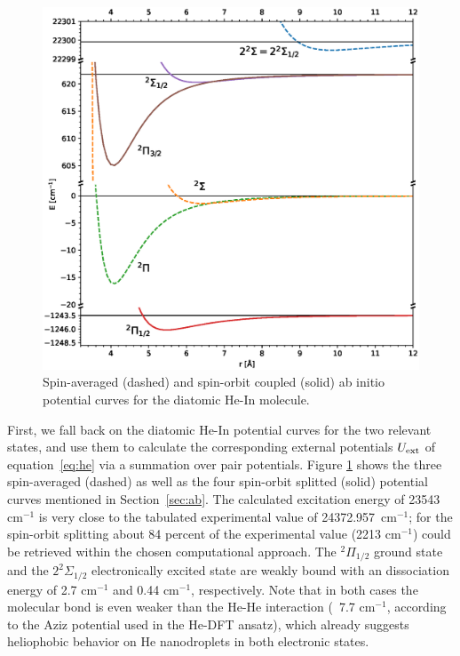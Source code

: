\documentclass[twoside,twocolumn,9pt]{article}
\begin{document}
\begin{figure}[h!]
  	\begin{center}
 		\includegraphics[width=\columnwidth]{2.eps}
                \caption{Spin-averaged (dashed) and spin-orbit coupled (solid) ab initio potential curves for the diatomic He-In molecule. \label{pic:pes}}
  	\end{center}
\end{figure}

First, we fall back on the diatomic He-In potential curves for the two relevant states, and use them to calculate the corresponding external potentials $U_{\rm ext}$ of equation~\ref{eq:he} via a summation over pair potentials. Figure \ref{pic:pes} shows the three spin-averaged (dashed) as well as the four spin-orbit splitted  (solid) potential curves mentioned in Section~\ref{sec:ab}. The calculated excitation energy of 23543 cm$^{-1}$ is very close to the tabulated experimental value of 24372.957~cm$^{-1}$; for the spin-orbit splitting about 84 percent of the experimental value (2213 cm$^{-1}$)  could be retrieved within the chosen computational approach.\cite{NIST} The $^2\Pi_{1/2}$ ground state and the $2^2\Sigma{}_{1/2}$ electronically excited state are weakly bound with an dissociation energy of 2.7 cm$^{-1}$ and 0.44 cm$^{-1}$, respectively. Note that in both cases the molecular bond is even weaker than the He-He interaction (~7.7 cm$^{-1}$, according to the Aziz potential\cite{Janzen:1997hv} used in the He-DFT ansatz), which already suggests heliophobic behavior on He nanodroplets in both electronic states. 
\end{document}
